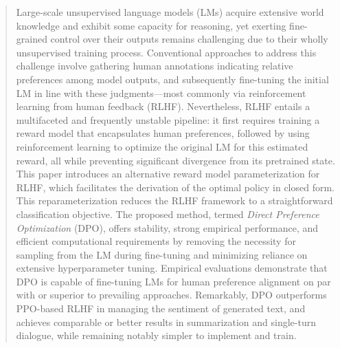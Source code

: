 \begin{abstract}
Large-scale unsupervised language models (LMs) acquire extensive world knowledge and exhibit some capacity for reasoning, yet exerting fine-grained control over their outputs remains challenging due to their wholly unsupervised training process. Conventional approaches to address this challenge involve gathering human annotations indicating relative preferences among model outputs, and subsequently fine-tuning the initial LM in line with these judgments—most commonly via reinforcement learning from human feedback (RLHF). Nevertheless, RLHF entails a multifaceted and frequently unstable pipeline: it first requires training a reward model that encapsulates human preferences, followed by using reinforcement learning to optimize the original LM for this estimated reward, all while preventing significant divergence from its pretrained state. This paper introduces an alternative reward model parameterization for RLHF, which facilitates the derivation of the optimal policy in closed form. This reparameterization reduces the RLHF framework to a straightforward classification objective. The proposed method, termed \textit{Direct Preference Optimization} (DPO), offers stability, strong empirical performance, and efficient computational requirements by removing the necessity for sampling from the LM during fine-tuning and minimizing reliance on extensive hyperparameter tuning. Empirical evaluations demonstrate that DPO is capable of fine-tuning LMs for human preference alignment on par with or superior to prevailing approaches. Remarkably, DPO outperforms PPO-based RLHF in managing the sentiment of generated text, and achieves comparable or better results in summarization and single-turn dialogue, while remaining notably simpler to implement and train.
\end{abstract}

